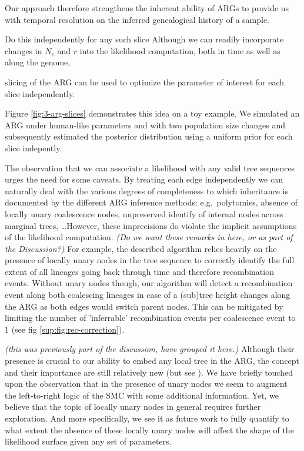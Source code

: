 \documentclass{article}
\newcommand{\comment}[1]{{\it \color{orange} (#1)}}
\begin{document}
Our approach therefore strengthens
the inherent ability of ARGs to provide us with temporal
resolution on the inferred genealogical history of a sample.

Do this independently for any such slice
Although we can readily incorporate changes in $N_e$ and $r$ 
into the likelihood computation, both in time as well as along the genome,


slicing of the ARG can be used to optimize the parameter of interest
for each slice independently.


Figure \ref{fig:3-arg-slices} demonstrates this idea on a toy example.
We simulated an ARG under human-like parameters and with
two population size changes and subsequently estimated the posterior 
distribution using a uniform prior for each slice indepently.


The observation that we can associate a likelihood with any valid tree sequences
urges the need for some caveats. By treating each edge independently we can
naturally deal with the various degrees of completeness to which inheritance
is documented by the different ARG inference methods: e.g.\ polytomies, absence
of locally unary coalescence nodes, unpreserved identify of internal nodes 
across marginal trees, \dots However, these imprecisions do violate the implicit
assumptions of the likelihood computation.
\comment{Do we want these remarks in here, or as part of the Discussion?}
For example, the described algorithm relies heavily on the
presence of locally unary nodes in the tree sequence to correctly identify the 
full extent of all lineages going back through time and therefore recombination
events. Without unary nodes though, our algorithm will detect a recombination
event along both coalescing lineages in case of a (sub)tree height changes along
the ARG as both edges would switch parent nodes. This can be mitigated by limiting
the number of 'inferrable' recombination events per coalescence event to 1 
(see fig \ref{sup:fig:rec-correction}).

\comment{this was previously part of the discussion, have grouped it here.}
Although their presence is crucial to our ability to embed any local tree in the
ARG, the concept and their importance are still relatively new (but see
\citet{wong_general_2023}).
We have briefly touched upon the observation that in
the presence of unary nodes we seem to augment the left-to-right logic of the SMC
with some additional information. Yet, we believe that the topic of locally 
unary nodes in general requires further exploration.
And more specifically, we see it as future work to fully quantify to what 
extent the absence of these locally unary nodes will affect the shape of the
likelihood surface given any set of parameters.
\end{document}
